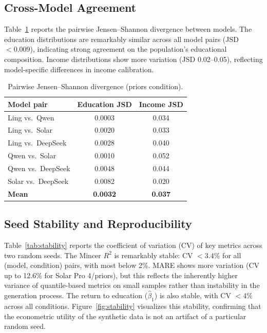 \documentclass[11pt]{article}
\begin{document}
\subsection{Cross-Model Agreement}

Table~\ref{tab:jsd} reports the pairwise Jensen--Shannon divergence between models.
The education distributions are remarkably similar across all model pairs (JSD $< 0.009$), indicating strong agreement on the population's educational composition.
Income distributions show more variation (JSD 0.02--0.05), reflecting model-specific differences in income calibration.

\begin{table}[htbp]
\centering
\caption{Pairwise Jensen--Shannon divergence (priors condition).}
\label{tab:jsd}
\small
\begin{tabular}{lcc}
\toprule
\textbf{Model pair} & \textbf{Education JSD} & \textbf{Income JSD} \\
\midrule
Ling vs.\ Qwen       & 0.0003 & 0.034 \\
Ling vs.\ Solar       & 0.0020 & 0.033 \\
Ling vs.\ DeepSeek    & 0.0028 & 0.040 \\
Qwen vs.\ Solar       & 0.0010 & 0.052 \\
Qwen vs.\ DeepSeek    & 0.0048 & 0.044 \\
Solar vs.\ DeepSeek   & 0.0082 & 0.020 \\
\midrule
\textbf{Mean}         & \textbf{0.0032} & \textbf{0.037} \\
\bottomrule
\end{tabular}
\end{table}

\subsection{Seed Stability and Reproducibility}

Table~\ref{tab:stability} reports the coefficient of variation (CV) of key metrics across two random seeds.
The Mincer $R^2$ is remarkably stable: CV $< 3.4\%$ for all (model, condition) pairs, with most below 2\%.
MARE shows more variation (CV up to 12.6\% for Solar Pro 4/priors), but this reflects the inherently higher variance of quantile-based metrics on small samples rather than instability in the generation process.
The return to education ($\hat{\beta}_1$) is also stable, with CV $< 4\%$ across all conditions.
Figure~\ref{fig:stability} visualizes this stability, confirming that the econometric utility of the synthetic data is not an artifact of a particular random seed.
\end{document}
